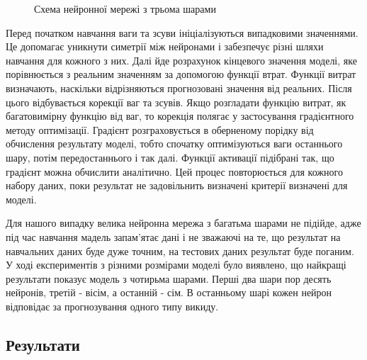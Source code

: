 \begin{figure}[H]
\begin{center}
{
            }
            \caption{Схема нейронної мережі з трьома шарами}
    \end{center}
\end{figure}

Перед початком навчання ваги та зсуви ініціалізуються випадковими значеннями. 
Це допомагає уникнути симетрії між нейронами і забезпечує різні шляхи навчання для кожного з них. 
Далі йде розрахунок кінцевого значення моделі, яке порівнюється з реальним значенням за допомогою функції втрат. 
Функції витрат визначають, наскільки відрізняються прогнозовані значення від реальних. 
Після цього відбувається корекції ваг та зсувів. 
Якщо розгладати функцію витрат, як багатовимірну функцію від ваг, то корекція полягає у застосування градієнтного методу оптимізації. 
Градієнт розграховується в оберненому порідку від обчислення результату моделі, тобто спочатку оптимізуються ваги останнього шару, потім передостаннього і так далі. 
Функції активації підібрані так, що градієнт можна обчислити аналітично. 
Цей процес повторюється для кожного набору даних, поки результат не задовільнить визначені критерії визначені для моделі. 

Для нашого випадку велика нейронна мережа з багатьма шарами не підійде, адже під час навчання мадель запам'ятає дані і не зважаючі на те, що результат на навчальних даних буде дуже точним, на тестових даних результат буде поганим. 
У ході експериментів з різними розмірами моделі було виявлено, що найкращі результати показує модель з чотирьма шарами. 
Перші два шари пор десять нейронів, третій - вісім, а останній - сім. 
В останньому шарі кожен нейрон відповідає за прогнозування одного типу викиду. 

\subsection{Результати}

